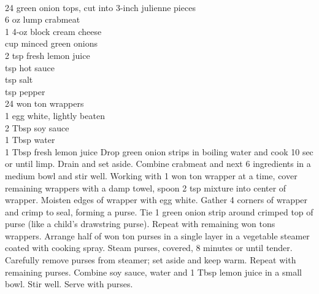 \begin{minipage}{\linewidth}
\end{minipage}\par\begin{minipage}{\linewidth} 
 \\
	\step
	{24 green onion tops, cut into 3-inch julienne pieces	 \\
	 6 oz lump crabmeat	 \\
	 1  4-oz block cream cheese \\	
	  cup minced green onions	 \\
	 2 tsp fresh lemon juice \\
	  tsp hot sauce	 \\
	  tsp salt \\
	  tsp pepper	 \\
	 24 won ton wrappers \\
	 1 egg white, lightly beaten	 \\
	 2 Tbsp soy sauce \\
	 1 Tbsp water	 \\
	 1 Tbsp fresh lemon juice	
		}{
Drop green onion strips in boiling water and cook 10 sec or until limp. Drain and set aside. Combine crabmeat and next 6 ingredients in a medium bowl and stir well. Working with 1 won ton wrapper at a time, cover remaining wrappers with a damp towel, spoon 2 tsp mixture into center of wrapper. Moisten edges of wrapper with egg white. Gather 4 corners of wrapper and crimp to seal, forming a purse. Tie 1 green onion strip around crimped top of purse (like a child's drawstring purse). Repeat with remaining won tons wrappers. Arrange half of won ton purses in a single layer in a vegetable steamer coated with cooking spray. Steam purses, covered, 8 minutes or until tender. Carefully remove purses from steamer; set aside and keep warm. Repeat with remaining purses. Combine soy sauce, water and 1 Tbsp lemon juice in a small bowl. Stir well. Serve with purses.}

\end{minipage}\par\begin{minipage}{\linewidth}  
\\


\end{minipage}
